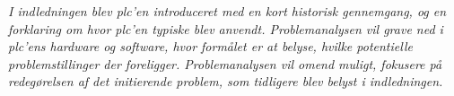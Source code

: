 \textit{I indledningen blev \gls{plc}’en introduceret med en kort historisk gennemgang, og en forklaring om hvor \gls{plc}’en typiske blev anvendt. Problemanalysen vil grave ned i \gls{plc}’ens hardware og software, hvor formålet er at belyse, hvilke potentielle problemstillinger der foreligger. Problemanalysen vil omend muligt, fokusere på redegørelsen af det initierende problem, som tidligere blev belyst i indledningen.}

